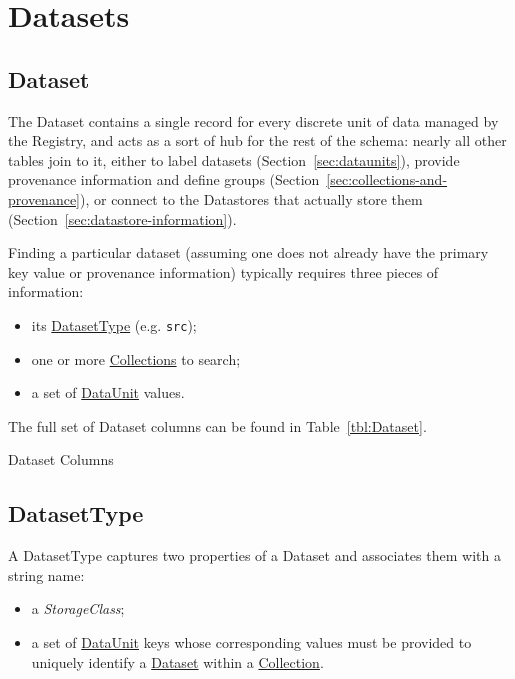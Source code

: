 \documentclass[DM,toc]{lsstdoc}
\newcommand{\tblref}[1]{\hyperref[tbl:#1]{#1}}
\newcommand{\coltable}[1]{
    \begin{table}[htb]
        {
            \footnotesize
            
        }
        \caption{#1 Columns}
        \label{tbl:#1}
    \end{table}
}
\begin{document}
\section{Datasets}
\label{sec:datasets}

\subsection{Dataset}
\label{sec:dataset}

The Dataset contains a single record for every discrete unit of data managed by the Registry, and acts as a sort of hub for the rest of the schema: nearly all other tables join to it, either to label datasets (Section~\ref{sec:dataunits}), provide provenance information and define groups (Section~\ref{sec:collections-and-provenance}), or connect to the Datastores that actually store them (Section~\ref{sec:datastore-information}).

Finding a particular dataset (assuming one does not already have the primary key value or provenance information) typically requires three pieces of information:
\begin{itemize}
    \item its \hyperref[sec:DatasetType]{DatasetType} (e.g. \texttt{src});
    \item one or more \hyperref[sec:collections]{Collections} to search;
    \item a set of \hyperref[sec:dataunits]{DataUnit} values.
\end{itemize}

The full set of Dataset columns can be found in Table~\ref{tbl:Dataset}.

\coltable{Dataset}


\subsection{DatasetType}
\label{sec:DatasetType}

A DatasetType captures two properties of a Dataset and associates them with a string name:
\begin{itemize}
    \item a \emph{StorageClass};
    \item a set of \hyperref[sec:dataunits]{DataUnit} keys whose corresponding values must be provided to uniquely identify a \tblref{Dataset} within a \hyperref[sec:collections]{Collection}.
\end{itemize}
\end{document}
